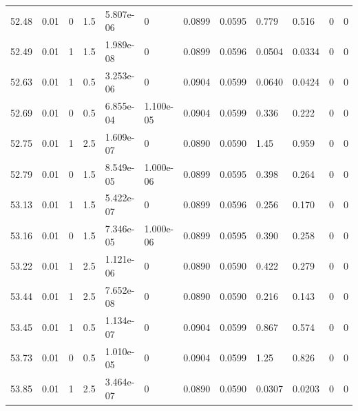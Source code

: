 \documentclass[preview]{standalone}
\begin{document}
{{{{{{{{{{\begin{tabular}{L{1.2cm}C{1.2cm} C{0.3cm}C{0.5cm} C{1.4cm}C{1.4cm} C{1.4cm}C{1.4cm} C{1.6cm}C{1.6cm} C{1.6cm}C{1.6cm}}
  52.48  &  0.01  & 0     & 1.5 &  5.807e-06  & 0  &  0.0899&   0.0595& 0.779 & 0.516   &  0 & 0  \\ 
  52.49  &  0.01  & 1     & 1.5 &  1.989e-08  & 0  &  0.0899&   0.0596& 0.0504 & 0.0334   &  0 & 0  \\ 
  52.63  &  0.01  & 1     & 0.5 &  3.253e-06  & 0  &  0.0904&   0.0599& 0.0640 & 0.0424   &  0 & 0  \\ 
  52.69  &  0.01  & 0     & 0.5 &  6.855e-04  & 1.100e-05  &  0.0904&   0.0599& 0.336 & 0.222   &  0 & 0  \\ 
  52.75  &  0.01  & 1     & 2.5 &  1.609e-07  & 0  &  0.0890&   0.0590& 1.45 & 0.959   &  0 & 0  \\ 
  52.79  &  0.01  & 0     & 1.5 &  8.549e-05  & 1.000e-06  &  0.0899&   0.0595& 0.398 & 0.264   &  0 & 0  \\ 
  53.13  &  0.01  & 1     & 1.5 &  5.422e-07  & 0  &  0.0899&   0.0596& 0.256 & 0.170   &  0 & 0  \\ 
  53.16  &  0.01  & 0     & 1.5 &  7.346e-05  & 1.000e-06  &  0.0899&   0.0595& 0.390 & 0.258   &  0 & 0  \\ 
  53.22  &  0.01  & 1     & 2.5 &  1.121e-06  & 0  &  0.0890&   0.0590& 0.422 & 0.279   &  0 & 0  \\ 
  53.44  &  0.01  & 1     & 2.5 &  7.652e-08  & 0  &  0.0890&   0.0590& 0.216 & 0.143   &  0 & 0  \\ 
  53.45  &  0.01  & 1     & 0.5 &  1.134e-07  & 0  &  0.0904&   0.0599& 0.867 & 0.574   &  0 & 0  \\ 
  53.73  &  0.01  & 0     & 0.5 &  1.010e-05  & 0  &  0.0904&   0.0599& 1.25 & 0.826   &  0 & 0  \\ 
  53.85  &  0.01  & 1     & 2.5 &  3.464e-07  & 0  &  0.0890&   0.0590& 0.0307 & 0.0203   &  0 & 0  \\ 
\hline 
\end{tabular} 

}}}}}}}}}}
\end{document}
